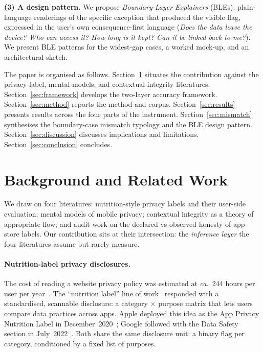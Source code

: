 \documentclass[11pt,a4paper]{article}
\makeatletter
\let\@oldsection\section
\renewcommand{\section}{\FloatBarrier\@oldsection}
\makeatother
\begin{document}
\textbf{(3) A design pattern.}
We propose \emph{Boundary-Layer Explainers} (BLEs): plain-language
renderings of the specific exception that produced the visible flag,
expressed in the user's own consequence-first language (\emph{Does
the data leave the device? Who can access it? How long is it kept?
Can it be linked back to me?}). We present BLE patterns for the
widest-gap cases, a worked mock-up, and an architectural sketch.

The paper is organised as follows. Section~\ref{sec:related} situates
the contribution against the privacy-label, mental-models, and
contextual-integrity literatures. Section~\ref{sec:framework}
develops the two-layer accuracy framework.
Section~\ref{sec:method} reports the method and corpus.
Section~\ref{sec:results} presents results across the four parts of
the instrument. Section~\ref{sec:mismatch} synthesises the
boundary-case mismatch typology and the BLE design pattern.
Section~\ref{sec:discussion} discusses implications and limitations.
Section~\ref{sec:conclusion} concludes.

\section{Background and Related Work}\label{sec:related}

We draw on four literatures: nutrition-style privacy labels and their
user-side evaluation; mental models of mobile privacy; contextual
integrity as a theory of appropriate flow; and audit work on the
declared-vs-observed honesty of app-store labels. Our contribution
sits at their intersection: the \emph{inference layer} the four
literatures assume but rarely measure.

\paragraph{Nutrition-label privacy disclosures.}
The cost of reading a website privacy policy was estimated at
\textit{ca.}\ 244 hours per user per
year~\citep{mcdonald:cranor:2008,solove:2013,cranor:2012}. The
``nutrition label'' line of work~\citep{kelley:etal:2009,
kelley:etal:2010,kelley:etal:2013,schaub:etal:2015} responded with a
standardised, scannable disclosure: a category $\times$ purpose
matrix that lets users compare data practices across apps. Apple
deployed this idea as the App Privacy Nutrition Label in
December~2020~\citep{apple:label:2020}; Google followed with the Data
Safety section in July~2022~\citep{google:data:safety:2022}. Both
share the same disclosure unit: a binary flag per category, conditioned
by a fixed list of purposes.
\end{document}
